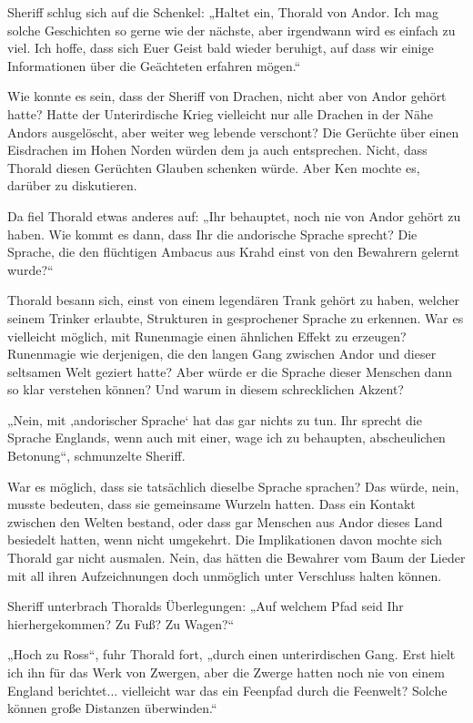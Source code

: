 Sheriff schlug sich auf die Schenkel: „Haltet ein, Thorald von Andor. Ich mag solche Geschichten so gerne wie der nächste, aber irgendwann wird es einfach zu viel. Ich hoffe, dass sich Euer Geist bald wieder beruhigt, auf dass wir einige Informationen über die Geächteten erfahren mögen.“

Wie konnte es sein, dass der Sheriff von Drachen, nicht aber von Andor gehört hatte? Hatte der Unterirdische Krieg vielleicht nur alle Drachen in der Nähe Andors ausgelöscht, aber weiter weg lebende verschont? Die Gerüchte über einen Eisdrachen im Hohen Norden würden dem ja auch entsprechen. Nicht, dass Thorald diesen Gerüchten Glauben schenken würde. Aber Ken mochte es, darüber zu diskutieren.

Da fiel Thorald etwas anderes auf: „Ihr behauptet, noch nie von Andor gehört zu haben. Wie kommt es dann, dass Ihr die andorische Sprache sprecht? Die Sprache, die den flüchtigen Ambacus aus Krahd einst von den Bewahrern gelernt wurde?“

Thorald besann sich, einst von einem legendären Trank gehört zu haben, welcher seinem Trinker erlaubte, Strukturen in gesprochener Sprache zu erkennen. War es vielleicht möglich, mit Runenmagie einen ähnlichen Effekt zu erzeugen? Runenmagie wie derjenigen, die den langen Gang zwischen Andor und dieser seltsamen Welt geziert hatte? Aber würde er die Sprache dieser Menschen dann so klar verstehen können? Und warum in diesem schrecklichen Akzent?

„Nein, mit ‚andorischer Sprache‘ hat das gar nichts zu tun. Ihr sprecht die Sprache Englands, wenn auch mit einer, wage ich zu behaupten, abscheulichen Betonung“, schmunzelte Sheriff.

War es möglich, dass sie tatsächlich dieselbe Sprache sprachen? Das würde, nein, musste bedeuten, dass sie gemeinsame Wurzeln hatten. Dass ein Kontakt zwischen den Welten bestand, oder dass gar Menschen aus Andor dieses Land besiedelt hatten, wenn nicht umgekehrt. Die Implikationen davon mochte sich Thorald gar nicht ausmalen. Nein, das hätten die Bewahrer vom Baum der Lieder mit all ihren Aufzeichnungen doch unmöglich unter Verschluss halten können.

Sheriff unterbrach Thoralds Überlegungen: „Auf welchem Pfad seid Ihr hierhergekommen? Zu Fuß? Zu Wagen?“

„Hoch zu Ross“, fuhr Thorald fort, „durch einen unterirdischen Gang. Erst hielt ich ihn für das Werk von Zwergen, aber die Zwerge hatten noch nie von einem England berichtet... vielleicht war das ein Feenpfad durch die Feenwelt? Solche können große Distanzen überwinden.“

